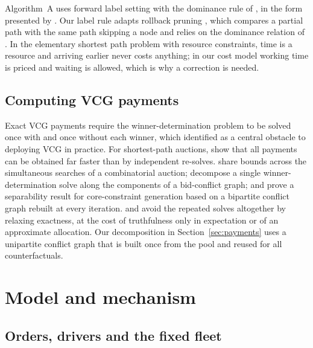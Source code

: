 \documentclass[review,12pt]{elsarticle}
\theoremstyle{definition}
\theoremstyle{remark}
\begin{document}
Algorithm~A uses forward label setting with the dominance rule of
\citet{dumas1991pickup}, in the form presented by
\citet{gschwind2018bidirectional}. Our label rule adapts rollback pruning
\citep{lozano2016exact}, which compares a partial path with the same path
skipping a node and relies on the dominance relation of
\citet{feillet2004exact}. In the elementary shortest path problem with
resource constraints, time is a resource and arriving earlier never costs
anything; in our cost model working time is priced and waiting is allowed,
which is why a correction is needed.

\subsection{Computing VCG payments}

Exact VCG payments require the winner-determination problem to be solved
once with and once without each winner, which \citet{nisan2000computationally}
identified as a central obstacle to deploying VCG in practice. For
shortest-path auctions, \citet{hershberger2001vickrey} show that all
payments can be obtained far faster than by independent re-solves.
\citet{bleischwitz2005accelerating} share bounds across the simultaneous
searches of a combinatorial auction; \citet{sandholm2005cabob} decompose a
single winner-determination solve along the components of a bid-conflict
graph; and \citet{bunz2015faster} prove a separability result for
core-constraint generation based on a bipartite conflict graph rebuilt at
every iteration. \citet{wilkens2012single} and \citet{li2026auction} avoid
the repeated solves altogether by relaxing exactness, at the cost of
truthfulness only in expectation or of an approximate allocation. Our
decomposition in Section~\ref{sec:payments} uses a unipartite conflict
graph that is built once from the pool and reused for all counterfactuals.

\section{Model and mechanism}
\label{sec:model}

\subsection{Orders, drivers and the fixed fleet}
\end{document}

